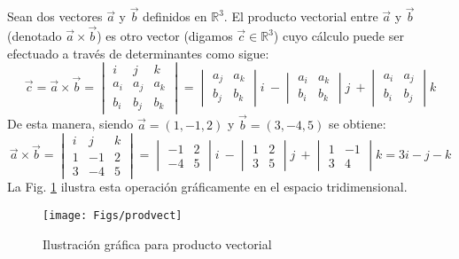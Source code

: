 Sean dos vectores $\vec{a}$ y $\vec{b}$ definidos en $\mathbb{R}^3$. El producto vectorial entre $\vec{a}$ y $\vec{b}$ (denotado $\vec{a} \times \vec{b}$) es otro vector (digamos $\vec{c} \in \mathbb{R}^3$) cuyo cálculo puede ser efectuado a través de determinantes como sigue:
\begin{equation}\label{defprodvect}
\vec{c} = \vec{a} \times \vec{b} = \begin{vmatrix}
i& j & k \\
a_i & a_j  & a_k \\
b_i & b_j  & b_k
\end{vmatrix} =
\begin{vmatrix}
 a_j & a_k \\
 b_j & b_k
\end{vmatrix}i~
-
\begin{vmatrix}
a_i & a_k \\
b_i & b_k
\end{vmatrix}j~
+\begin{vmatrix}
 a_i & a_j \\
 b_i & b_j
\end{vmatrix}k
\end{equation}
De esta manera, siendo $\vec{a}=(1,-1,2)$ y $\vec{b}=(3,-4,5)$ se obtiene:
\begin{equation}
\vec{a} \times \vec{b} =\begin{vmatrix}
i& j & k \\
1 &-1  &2 \\
3 &-4  &5
\end{vmatrix}=
\begin{vmatrix}
 -1&2 \\
 -4&5
\end{vmatrix}i~
-
\begin{vmatrix}
1 &2 \\
3 &5
\end{vmatrix}j~
+\begin{vmatrix}
 1&-1 \\
 3&4
\end{vmatrix}k
= 3i-j-k
\end{equation}
La Fig. \ref{prodvect} ilustra esta operación gráficamente en el espacio tridimensional.
\begin{figure}[h]
\centering
\texttt{[image: Figs/prodvect]}
\caption[]{Ilustración gráfica para producto vectorial}\label{prodvect}
\end{figure}

